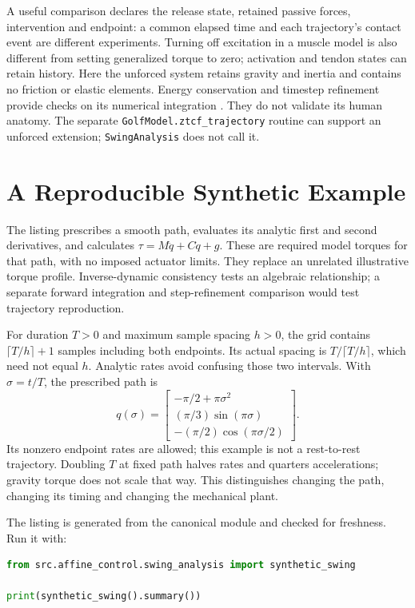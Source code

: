 A useful comparison declares the release state, retained passive forces,
intervention and endpoint: a common elapsed time and each trajectory's contact
event are different experiments. Turning off excitation in a muscle model is
also different from setting generalized torque to zero; activation and tendon
states can retain history. Here the unforced system retains gravity and inertia
and contains no friction or elastic elements. Energy conservation and timestep
refinement provide checks on its numerical integration
\cite{LynchParkForwardReview}. They do not validate its human anatomy.
The separate \texttt{GolfModel.ztcf\_trajectory} routine can support an unforced
extension; \texttt{SwingAnalysis} does not call it.

\section{A Reproducible Synthetic Example}

The listing prescribes a smooth path, evaluates its analytic first and second
derivatives, and calculates $\tau=M\ddot q+C\dot q+g$. These are required
model torques for that path, with no imposed actuator limits. They replace an
unrelated illustrative torque profile. Inverse-dynamic consistency tests an
algebraic relationship; a separate forward integration and step-refinement
comparison would test trajectory reproduction.

For duration $T>0$ and maximum sample spacing $h>0$, the grid contains
$\lceil T/h\rceil+1$ samples including both endpoints. Its actual spacing is
$T/\lceil T/h\rceil$, which need not equal $h$. Analytic rates avoid confusing
those two intervals. With $\sigma=t/T$, the prescribed path is
\begin{equation}
 q(\sigma)=\begin{bmatrix}
 -\pi/2+\pi\sigma^2\\
 (\pi/3)\sin(\pi\sigma)\\
 -(\pi/2)\cos(\pi\sigma/2)
 \end{bmatrix}.
\end{equation}
Its nonzero endpoint rates are allowed; this example is not a rest-to-rest
trajectory. Doubling $T$ at fixed path halves rates and quarters accelerations;
gravity torque does not scale that way. This distinguishes changing the path,
changing its timing and changing the mechanical plant.



The listing is generated from the canonical module and checked for freshness.
Run it with:
\begin{lstlisting}[language=Python, caption={Running the Prescribed-Motion Analysis}]
from src.affine_control.swing_analysis import synthetic_swing

print(synthetic_swing().summary())
\end{lstlisting}

